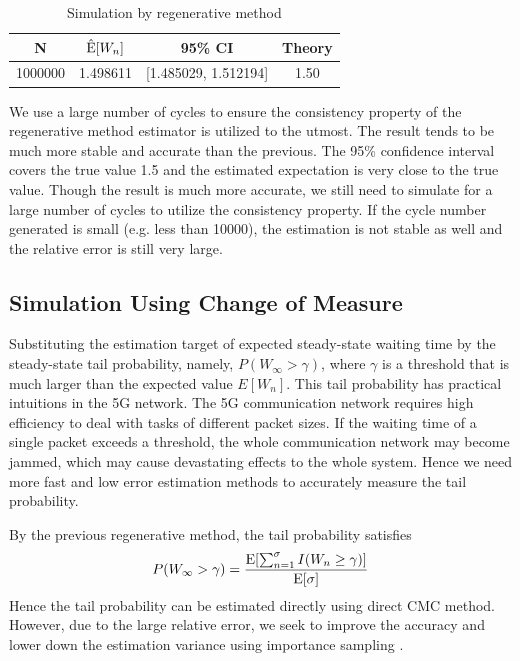 \documentclass{article}
\begin{document}
\begin{table}[!htbp]
    \small
	\centering
	\begin{tabularx}{0.47\textwidth}{cccc}
		\toprule
        N
		& $\hat{{\rm E}}[W_n]$ 
        & 95\% CI
		& Theory\\

        \midrule
        1000000
        & 1.498611
        & [1.485029, 1.512194]
		& 1.50

        \\
		\bottomrule
	\end{tabularx}%
	\label{tab:addlabel}%
	\caption{Simulation by regenerative method}
\end{table}%
We use a large number of cycles to ensure the consistency property of the regenerative method estimator is utilized to the utmost. The result tends to be much more stable and accurate than the previous. The 95\% confidence interval covers the true value 1.5 and the estimated expectation is very close to the true value. 
Though the result is much more accurate, we still need to simulate for a large number of cycles to utilize the consistency property. If the cycle number generated is small (e.g. less than 10000), the estimation is not stable as well and the relative error is still very large.


\subsection{Simulation Using Change of Measure}
Substituting the estimation target of expected steady-state waiting time by the steady-state tail probability, namely, $P(W_{\infty} > \gamma)$, where $\gamma$ is a threshold that is much larger than the expected value $E[W_n]$. This tail probability has practical intuitions in the 5G network. The 5G communication network requires high efficiency to deal with tasks of different packet sizes. If the waiting time of a single packet exceeds a threshold, the whole communication network may become jammed, which may cause devastating effects to the whole system. 
Hence we need more fast and low error estimation methods to accurately measure the tail probability.

By the previous regenerative method, the tail probability satisfies
\begin{equation}
	P(W_{\infty}>\gamma)=\frac{{\rm E}[\sum_{n=1}^{\sigma}I(W_n \geq \gamma)]}{{\rm E}[\sigma]}	
\end{equation}
Hence the tail probability can be estimated directly using direct CMC method. However, due to the large relative error, we seek to improve the accuracy and lower down the estimation variance using importance sampling \citep{ross2014introduction}.
\end{document}
